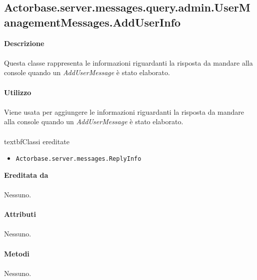 \documentclass[a4paper]{article}
\begin{document}
	\subsection{Actorbase.server.messages.query.admin.UserManagementMessages.AddUserInfo}
		\textbf{Descrizione}
			\\ \\
			Questa classe rappresenta le informazioni riguardanti la risposta da mandare alla console quando un \emph{AddUserMessage} è stato elaborato.
			\\ \\
		\textbf{Utilizzo}
			\\ \\
			Viene usata per aggiungere le informazioni riguardanti la risposta da mandare alla console quando un \emph{AddUserMessage} è stato elaborato.
			\\ \\
		textbf{Classi ereditate}
			\begin{itemize}
				\item \texttt{Actorbase.server.messages.ReplyInfo}
			\end{itemize}
		\textbf{Ereditata da}
			\\ \\
			Nessuno.
			\\ \\
		\textbf{Attributi}
			\\ \\
			Nessuno.
			\\ \\
		\textbf{Metodi}
			\\ \\
			Nessuno.
			
\end{document}
